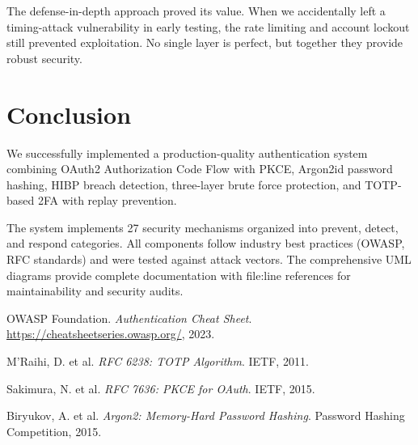 \documentclass[12pt,a4paper]{article}
\begin{document}
The defense-in-depth approach proved its value. When we accidentally left a timing-attack vulnerability in early testing, the rate limiting and account lockout still prevented exploitation. No single layer is perfect, but together they provide robust security.

\section{Conclusion}

We successfully implemented a production-quality authentication system combining OAuth2 Authorization Code Flow with PKCE, Argon2id password hashing, HIBP breach detection, three-layer brute force protection, and TOTP-based 2FA with replay prevention.

The system implements 27 security mechanisms organized into prevent, detect, and respond categories. All components follow industry best practices (OWASP, RFC standards) and were tested against attack vectors. The comprehensive UML diagrams provide complete documentation with file:line references for maintainability and security audits.

\begin{thebibliography}{9}

OWASP Foundation.
\textit{Authentication Cheat Sheet}.
\url{https://cheatsheetseries.owasp.org/}, 2023.

M'Raihi, D. et al.
\textit{RFC 6238: TOTP Algorithm}.
IETF, 2011.

Sakimura, N. et al.
\textit{RFC 7636: PKCE for OAuth}.
IETF, 2015.

Biryukov, A. et al.
\textit{Argon2: Memory-Hard Password Hashing}.
Password Hashing Competition, 2015.

\end{thebibliography}

\listoffigures
\end{document}
